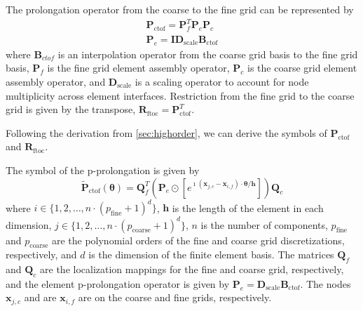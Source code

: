 \documentclass[review]{siamart190516}
\begin{document}
The prolongation operator from the coarse to the fine grid can be represented by
\begin{equation}
\begin{split}
\mathbf{P}_{\text{ctof}} = \mathbf{P}_f^T \mathbf{P}_e \mathbf{P}_c\\
\mathbf{P}_e = \mathbf{I} \mathbf{D}_{\text{scale}} \mathbf{B}_{\text{ctof}}
\end{split}
\end{equation}
where $\mathbf{B}_{ctof}$ is an interpolation operator from the coarse grid basis to the fine grid basis, $\mathbf{P}_f$ is the fine grid element assembly operator, $\mathbf{P}_c$ is the coarse grid element assembly operator, and $\mathbf{D}_{\text{scale}}$ is a scaling operator to account for node multiplicity across element interfaces.
Restriction from the fine grid to the coarse grid is given by the transpose, $\mathbf{R}_{\text{ftoc}} = \mathbf{P}_{\text{ctof}}^T$.

Following the derivation from \cref{sec:highorder}, we can derive the symbols of $\mathbf{P}_{\text{ctof}}$ and $\mathbf{R}_{\text{ftoc}}$.

\begin{definition}\label{def:prolongation_symbol}
The symbol of the p-prolongation is given by
\begin{equation}
\tilde{\mathbf{P}}_{\text{ctof}} \left( \boldsymbol{\theta} \right) = \mathbf{Q}_f^T \left( \mathbf{P}_e \odot \left[ e^{\imath \left( \mathbf{x}_{j, c} - \mathbf{x}_{i, f} \right) \cdot \boldsymbol{\theta} / \mathbf{h}} \right] \right) \mathbf{Q}_c
\end{equation}
where $i \in \lbrace 1, 2, \dots, n \cdot \left( p_{\text{fine}} + 1 \right)^d \rbrace$, $\mathbf{h}$ is the length of the element in each dimension, $j \in \lbrace 1, 2, \dots, n \cdot \left( p_{\text{coarse}} + 1 \right)^d \rbrace$, $n$ is the number of components, $p_{\text{fine}}$ and $p_{\text{coarse}}$ are the polynomial orders of the fine and coarse grid discretizations, respectively, and $d$ is the dimension of the finite element basis.
The matrices $\mathbf{Q}_f$ and $\mathbf{Q}_c$ are the localization mappings for the fine and coarse grid, respectively, and the element p-prolongation operator is given by $\mathbf{P}_e = \mathbf{D}_{\text{scale}} \mathbf{B}_{\text{ctof}}$.
The nodes $\mathbf{x}_{j, c}$ and are $\mathbf{x}_{i, f}$ are on the coarse and fine grids, respectively.
\end{definition}
\end{document}
